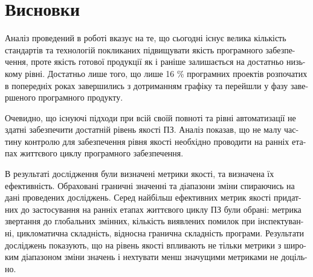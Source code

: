 \chapter*{Висновки}

Аналіз проведений в роботі вказує на те, що сьогодні існує велика кількість стандартів та технологій покликаних підвищувати якість програмного забезпе-чення, проте якість готової продукції як і раніше залишається на достатньо низь-кому рівні. Достатньо лише того, що лише 16 \% програмних проектів розпочатих в попередніх роках завершились з дотриманням графіку та перейшли у фазу заве-ршеного програмного продукту.

Очевидно, що існуючі підходи при всій своїй повноті та рівні автоматизації не здатні забезпечити достатній рівень якості ПЗ. Аналіз показав, що не малу час-тину контролю для забезпечення рівня якості необхідно проводити на ранніх ета-пах життєвого циклу програмного забезпечення.

В результаті дослідження були визначені метрики якості, та визначена їх ефективність. Обраховані граничні значенні та діапазони зміни спираючись на дані проведених досліджень. Серед найбільш ефективних метрик якості придат-них до застосування на ранніх етапах життєвого циклу ПЗ були обрані: метрика звертання до глобальних змінних, кількість виявлених помилок при інспектуван-ні, цикломатична складність, відносна гранична складність програми. Результати досліджень показують, що на рівень якості впливають не тільки метрики з широ-ким діапазоном зміни значень і нехтувати менш значущими метриками не доціль-но.
